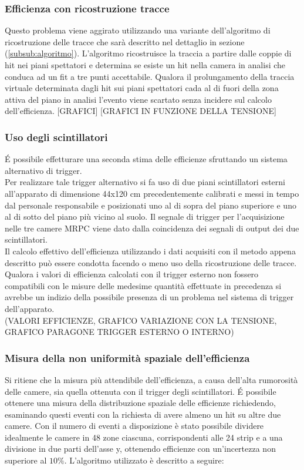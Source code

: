 \documentclass[8pt]{extarticle}
\begin{document}
\subsubsection{Efficienza con ricostruzione tracce}
Questo problema viene aggirato utilizzando una variante dell'algoritmo di ricostruzione delle tracce che sarà descritto nel dettaglio in sezione (\ref{subsub:algoritmo}). L'algoritmo ricostruisce la traccia a partire dalle coppie di hit nei piani spettatori e determina se esiste un hit nella camera in analisi che conduca ad un fit a tre punti accettabile. Qualora il prolungamento della traccia virtuale determinata dagli hit sui piani spettatori cada al di fuori della zona attiva del piano in analisi l'evento viene scartato senza incidere sul calcolo dell'efficienza.
[GRAFICI]
[GRAFICI IN FUNZIONE DELLA TENSIONE]

\subsubsection{Uso degli scintillatori}
\'E possibile effetturare una seconda stima delle efficienze sfruttando un sistema alternativo di trigger. \\
Per realizzare tale trigger alternativo si fa uso di due piani scintillatori esterni all'apparato di dimensione 44x120 cm precedentemente calibrati e messi in tempo dal personale responsabile e posizionati uno al di sopra del piano superiore e uno al di sotto del piano più vicino al suolo. Il segnale di trigger per l'acquisizione nelle tre camere  MRPC viene dato dalla coincidenza dei segnali di output dei due scintillatori. \\
Il calcolo effettivo dell'efficienza utilizzando i dati acquisiti con il metodo appena descritto può essere condotta facendo o meno uso della ricostruzione delle tracce.
Qualora i valori di efficienza calcolati con il trigger esterno non fossero compatibili con le misure delle medesime quantità effettuate in precedenza si avrebbe un indizio della possibile presenza di un problema nel sistema di trigger dell'apparato.\\
(VALORI EFFICIENZE, GRAFICO VARIAZIONE CON LA TENSIONE, GRAFICO PARAGONE TRIGGER ESTERNO O INTERNO)

\subsubsection{Misura della non uniformità spaziale dell'efficienza}
Si ritiene che la misura più attendibile dell'efficienza, a causa dell'alta rumorosità delle camere, sia quella ottenuta con il trigger degli scintillatori. \'E possibile ottenere una misura della distribuzione spaziale delle efficienze richiedendo, esaminando questi eventi con la richiesta di avere almeno un hit su altre due camere. Con il numero di eventi a disposizione è stato possibile dividere idealmente le camere in 48 zone ciascuna, corrispondenti alle 24 strip e a una divisione in due parti dell'asse y, ottenendo efficienze con un'incertezza non superiore al $10 \%$. L'algoritmo utilizzato è descritto a seguire: \\
\end{document}
